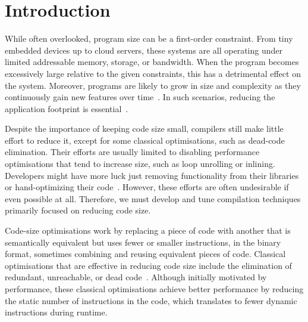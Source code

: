 
\chapter{Introduction}


While often overlooked, program size can be a first-order constraint.
From tiny embedded devices up to cloud servers, these systems are all operating under limited addressable memory, storage, or bandwidth. When the program becomes excessively large relative to the given constraints, this has a detrimental effect on the system.
Moreover, programs are likely to grow in size and complexity as they continuously gain new features over time~\cite{lavaee19,chabbi21}.
In such scenarios, reducing the application footprint is essential~\cite{schultz03,varma04,sehgal12,keoh14,auler17,chabbi21}.



Despite the importance of keeping code size small, compilers still make little effort to reduce it, except for some classical optimisations, such as dead-code elimination.
Their efforts are usually limited to disabling performance optimisations that tend to increase size, such as loop unrolling or inlining.
Developers might have more luck just removing functionality from their libraries~\cite{keoh14} or hand-optimizing their code~\cite{weaver09}.
However, these efforts are often undesirable if even possible at all.
Therefore, we must develop and tune compilation techniques primarily focused on reducing code size.

Code-size optimisations work by replacing a piece of code with another that is semantically equivalent but uses fewer or smaller instructions, in the binary format, sometimes combining and reusing equivalent pieces of code.
Classical optimisations that are effective in reducing code size include the elimination of redundant, unreachable, or dead code~\cite{cocke70,briggs97,debray00}.
Although initially motivated by performance, these classical optimisations achieve better performance by reducing the static number of instructions in the code, which translates to fewer dynamic instructions during runtime.

